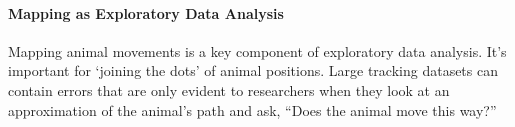 \begin{addmargin}[-2.0cm]{0cm}
{\begin{minipage}[t]{\linewidth}
				\medskip

				\paragraph*{Mapping as Exploratory Data Analysis}

				Mapping animal movements is a key component of exploratory data analysis. It's important for `joining the dots' of animal positions. Large tracking datasets can contain errors that are only evident to researchers when they look at an approximation of the animal's path and ask, “Does the animal move this way?”





    






\end{minipage}}
\end{addmargin}
